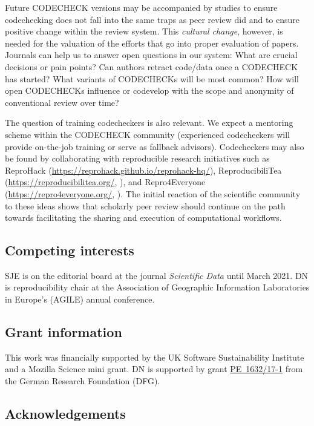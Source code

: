 \documentclass[12pt]{article}
\begin{document}
Future CODECHECK versions may be accompanied by studies to ensure
codechecking does not fall into the same traps as peer review did
\cite{tennant_limitations_2020} and to ensure positive change within
the review system.  This \emph{cultural change}, however, is needed
for the valuation of the efforts that go into proper evaluation of
papers.  Journals can help us to answer open questions in our system: What are
crucial decisions or pain points? Can authors retract code/data once a
CODECHECK has started?  What variants of CODECHECKs will be most
common? How will open CODECHECKs influence or codevelop with the scope
and anonymity of conventional review over time?

The question of training codecheckers is also relevant. We expect a
mentoring scheme within the CODECHECK community (experienced
codecheckers will provide on-the-job training or serve as fallback
advisors). Codecheckers may also be found by collaborating with
reproducible research initiatives such as
ReproHack (\url{https://reprohack.github.io/reprohack-hq/}),
ReproducibiliTea (\url{https://reproducibilitea.org/},
\cite{fitzgibbon_brewing_2020}), and
Repro4Everyone (\url{https://repro4everyone.org/},
\cite{auer_reproducibility_2020}).  The initial reaction of the
scientific community to these ideas shows that scholarly peer review
should continue on the path towards facilitating the sharing and
execution of computational workflows.

\subsection*{Competing interests}


SJE is on the editorial board at the journal \emph{Scientific Data}
until March 2021.  DN is reproducibility chair at the Association of
Geographic Information Laboratories in Europe's (AGILE) annual
conference.

\subsection*{Grant information}

This work was financially supported by the UK Software
Sustainability Institute and a Mozilla Science mini grant.
DN is supported by grant
\href{https://gepris.dfg.de/gepris/projekt/415851837}{PE~1632/17-1}
from the German Research Foundation (DFG).

\subsection*{Acknowledgements}\label{acknowledgements}
\end{document}
